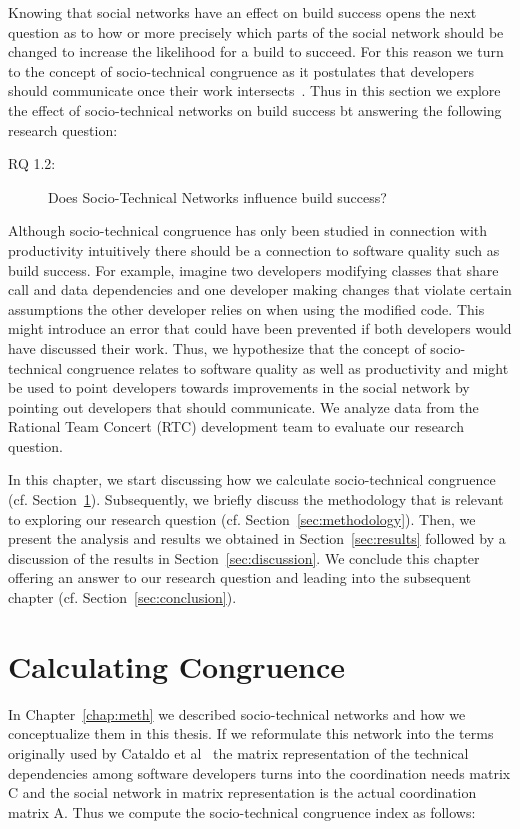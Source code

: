 \label{chap:stc-net2}
Knowing that social networks have an effect on build success opens the next question as to how or more precisely which parts of the social network should be changed to increase the likelihood for a build to succeed.
For this reason we turn to the concept of socio-technical congruence as it postulates that developers should communicate once their work intersects~\cite{kwan:tse:2011}.
Thus in this section we explore the effect of socio-technical networks on build success bt answering the following research question:

\begin{description}
  \item[RQ 1.2:] Does Socio-Technical Networks influence build success?
\end{description}

Although socio-technical congruence has only been studied in connection with productivity intuitively there should be a connection to software quality such as build success.
For example, imagine two developers modifying classes that share call and data dependencies and one developer making changes that violate certain assumptions the other developer relies on when using the modified code.
This might introduce an error that could have been prevented if both developers would have discussed their work.
Thus, we hypothesize that the concept of socio-technical congruence relates to software quality as well as productivity and might be used to point developers towards improvements in the social network by pointing out developers that should communicate.
We analyze data from the Rational Team Concert (RTC) development team to evaluate our research question.

In this chapter, we start discussing how we calculate socio-technical congruence (cf. Section~\ref{sec:congruence}).
Subsequently, we briefly discuss the methodology that is relevant to exploring our research question (cf. Section~\ref{sec:methodology}).
Then, we present the analysis and results we obtained in Section~\ref{sec:results} followed by a discussion of the results in Section~\ref{sec:discussion}.
We conclude this chapter offering an answer to our research question and leading into the subsequent chapter (cf. Section~\ref{sec:conclusion}).


\section{Calculating Congruence}
\label{sec:congruence}
In Chapter~\ref{chap:meth} we described socio-technical networks and how we conceptualize them in this thesis.
If we reformulate this network into the terms originally used by Cataldo et al~\cite{cataldo:cscw:2006} the matrix representation of the technical dependencies among software developers turns into the coordination needs matrix C and the social network in matrix representation is the actual coordination matrix A.
Thus we compute the socio-technical congruence index as follows:

